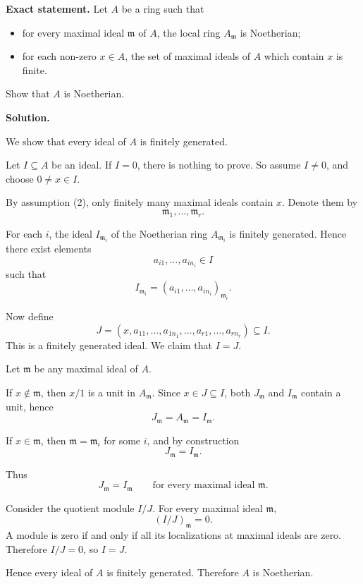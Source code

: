 \documentclass[12pt,a4paper]{article}
\theoremstyle{plain}
\theoremstyle{definition}      %
\begin{document}
	\textbf{Exact statement.}
	Let \(A\) be a ring such that
	\begin{itemize}
		\item[(1)] for every maximal ideal \(\mathfrak m\) of \(A\), the local ring \(A_{\mathfrak m}\) is Noetherian;
		\item[(2)] for each non-zero \(x\in A\), the set of maximal ideals of \(A\) which contain \(x\) is finite.
	\end{itemize}
	Show that \(A\) is Noetherian.
	
	\textbf{Solution.}
	
	We show that every ideal of \(A\) is finitely generated.
	
	Let \(I\subseteq A\) be an ideal. If \(I=0\), there is nothing to prove. So assume \(I\neq 0\), and choose \(0\neq x\in I\).
	
	By assumption (2), only finitely many maximal ideals contain \(x\). Denote them by
	\[
	\mathfrak m_1,\dots,\mathfrak m_r.
	\]
	
	For each \(i\), the ideal \(I_{\mathfrak m_i}\) of the Noetherian ring \(A_{\mathfrak m_i}\) is finitely generated. Hence there exist elements
	\[
	a_{i1},\dots,a_{in_i}\in I
	\]
	such that
	\[
	I_{\mathfrak m_i}=(a_{i1},\dots,a_{in_i})_{\mathfrak m_i}.
	\]
	
	Now define
	\[
	J=(x,a_{11},\dots,a_{1n_1},\dots,a_{r1},\dots,a_{rn_r})\subseteq I.
	\]
	This is a finitely generated ideal. We claim that \(I=J\).
	
	Let \(\mathfrak m\) be any maximal ideal of \(A\).
	
	If \(x\notin \mathfrak m\), then \(x/1\) is a unit in \(A_{\mathfrak m}\). Since \(x\in J\subseteq I\), both \(J_{\mathfrak m}\) and \(I_{\mathfrak m}\) contain a unit, hence
	\[
	J_{\mathfrak m}=A_{\mathfrak m}=I_{\mathfrak m}.
	\]
	
	If \(x\in \mathfrak m\), then \(\mathfrak m=\mathfrak m_i\) for some \(i\), and by construction
	\[
	J_{\mathfrak m}=I_{\mathfrak m}.
	\]
	
	Thus
	\[
	J_{\mathfrak m}=I_{\mathfrak m}
	\qquad \text{for every maximal ideal } \mathfrak m.
	\]
	
	Consider the quotient module \(I/J\). For every maximal ideal \(\mathfrak m\),
	\[
	(I/J)_{\mathfrak m}=0.
	\]
	A module is zero if and only if all its localizations at maximal ideals are zero. Therefore \(I/J=0\), so \(I=J\).
	
	Hence every ideal of \(A\) is finitely generated. Therefore \(A\) is Noetherian.
	
	
	
\end{document}
